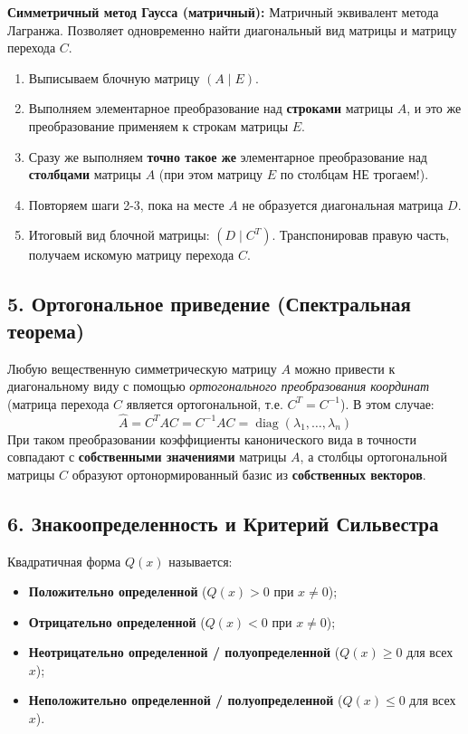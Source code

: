 \textbf{Симметричный метод Гаусса (матричный):}
Матричный эквивалент метода Лагранжа. Позволяет одновременно найти диагональный вид матрицы и матрицу перехода $C$.
\begin{enumerate}
    \item Выписываем блочную матрицу $(A \mid E)$.
    \item Выполняем элементарное преобразование над \textbf{строками} матрицы $A$, и это же преобразование применяем к строкам матрицы $E$.
    \item Сразу же выполняем \textbf{точно такое же} элементарное преобразование над \textbf{столбцами} матрицы $A$ (при этом матрицу $E$ по столбцам НЕ трогаем!).
    \item Повторяем шаги 2-3, пока на месте $A$ не образуется диагональная матрица $D$.
    \item Итоговый вид блочной матрицы: $(D \mid C^T)$. Транспонировав правую часть, получаем искомую матрицу перехода $C$.
\end{enumerate}

\subsection*{5. Ортогональное приведение (Спектральная теорема)}

Любую вещественную симметрическую матрицу $A$ можно привести к диагональному виду с помощью \textit{ортогонального преобразования координат} (матрица перехода $C$ является ортогональной, т.е. $C^T = C^{-1}$). В этом случае:
\[
\hat{A} = C^T A C = C^{-1} A C = \operatorname{diag}(\lambda_1, \dots, \lambda_n)
\]
При таком преобразовании коэффициенты канонического вида в точности совпадают с \textbf{собственными значениями} матрицы $A$, а столбцы ортогональной матрицы $C$ образуют ортонормированный базис из \textbf{собственных векторов}.

\subsection*{6. Знакоопределенность и Критерий Сильвестра}

Квадратичная форма $Q(x)$ называется:
\begin{itemize}
    \item \textbf{Положительно определенной} ($Q(x) > 0$ при $x \neq 0$);
    \item \textbf{Отрицательно определенной} ($Q(x) < 0$ при $x \neq 0$);
    \item \textbf{Неотрицательно определенной / полуопределенной} ($Q(x) \ge 0$ для всех $x$);
    \item \textbf{Неположительно определенной / полуопределенной} ($Q(x) \le 0$ для всех $x$).
\end{itemize}


